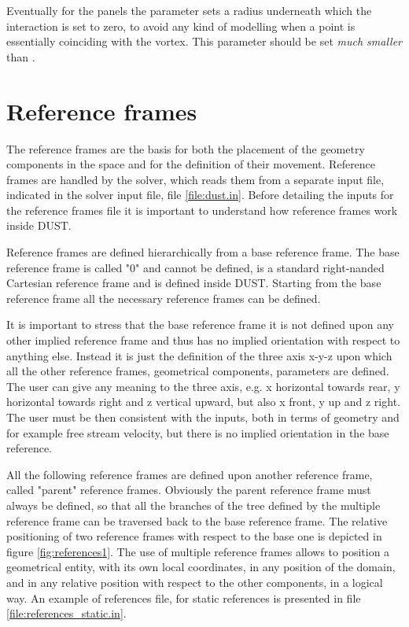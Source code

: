 Eventually for the panels the parameter  sets a radius 
underneath which the interaction is set to zero, to avoid any kind of 
modelling when a point is essentially coinciding with the vortex. 
This parameter should be set \emph{much smaller} than . 


\section{Reference frames}
\label{sec:Solver_ReferenceFrames}

The reference frames are the basis for both the placement of the geometry 
components in the space and for the definition of their movement.  
Reference frames are handled by the solver, which reads them from 
a separate input file, indicated in the solver input file, file 
\ref{file:dust.in}. Before detailing the inputs for the reference 
frames file it is important to understand how reference frames work 
inside DUST. %

Reference frames are defined hierarchically from a base reference frame. 
The base reference frame is called "0" and cannot be defined, 
is a standard right-nanded Cartesian reference frame and is defined 
inside DUST. Starting from the base reference frame all the necessary 
reference frames can be defined. 

It is important to stress that the base reference frame it is not 
defined upon any other implied reference frame and thus has no implied 
orientation with respect to anything else. Instead it is just the definition 
of the three axis x-y-z upon which all the other reference frames, geometrical 
components, parameters are defined. The user can give any meaning to the three 
axis, e.g. x horizontal towards rear, y horizontal towards right and z vertical 
upward, but also x front, y up and z right. The user must be then consistent 
with the inputs, both in terms of geometry and for example free stream velocity, 
but there is no implied orientation in the base reference.

All the following reference frames are defined upon another reference frame, 
called "parent" reference frames. Obviously the parent reference frame must 
always be defined, so that all the branches of the tree defined by the multiple 
reference frame can be traversed back to the base reference frame. The relative 
positioning of two reference frames with respect to the base one is depicted in 
figure \ref{fig:references1}. The use of multiple reference frames allows to 
position a geometrical entity, with its own local coordinates, in any position 
of the domain, and in any relative position with respect to the other components, 
in a logical way.  An example of references file, for static references is 
presented in file \ref{file:references_static.in}. 

